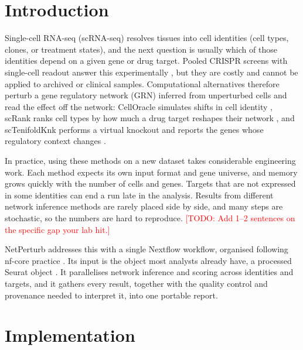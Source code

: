 \documentclass[unnumsec,webpdf,contemporary,large]{oup-authoring-template}
\newcommand{\todo}[1]{\textcolor{red}{[TODO: #1]}}
\begin{document}
\section{Introduction}

Single-cell RNA-seq (scRNA-seq) resolves tissues into cell identities (cell types, clones, or treatment states), and the next question is usually which of those identities depend on a given gene or drug target. Pooled CRISPR screens with single-cell readout answer this experimentally \citep{Dixit2016perturbseq}, but they are costly and cannot be applied to archived or clinical samples. Computational alternatives therefore perturb a gene regulatory network (GRN) inferred from unperturbed cells and read the effect off the network: CellOracle simulates shifts in cell identity \citep{Kamimoto2023celloracle}, scRank ranks cell types by how much a drug target reshapes their network \citep{Li2024scrank}, and scTenifoldKnk performs a virtual knockout and reports the genes whose regulatory context changes \citep{Osorio2022sctenifoldknk}.

In practice, using these methods on a new dataset takes considerable engineering work. Each method expects its own input format and gene universe, and memory grows quickly with the number of cells and genes. Targets that are not expressed in some identities can end a run late in the analysis. Results from different network inference methods are rarely placed side by side, and many steps are stochastic, so the numbers are hard to reproduce. \todo{Add 1--2 sentences on the specific gap your lab hit.}

NetPerturb addresses this with a single Nextflow \citep{DiTommaso2017nextflow} workflow, organised following nf-core practice \citep{Ewels2020nfcore}. Its input is the object most analysts already have, a processed Seurat object \citep{Hao2023seurat}. It parallelises network inference and scoring across identities and targets, and it gathers every result, together with the quality control and provenance needed to interpret it, into one portable report.

\section{Implementation}
\end{document}
